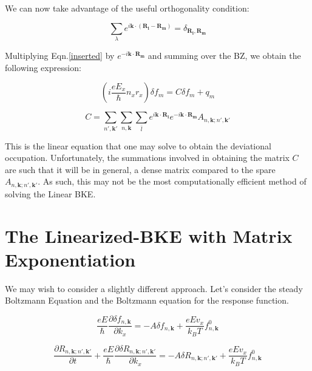\documentclass[preprint,12pt]{elsarticle}
\begin{document}
\noindent We can now take advantage of the useful orthogonality condition:

\begin{equation}
    \sum_{\lambda} e^{i \mathbf{k}\cdot (\mathbf{R_l}-\mathbf{R_m})} = \delta_{\mathbf{R_l},\mathbf{R_m}}
\end{equation}

\noindent Multiplying Eqn.\ref{inserted} by $e^{-i \mathbf{k}\cdot \mathbf{R_m}}$ and summing over the BZ, we obtain the following expression:

\begin{equation}
    (i \frac{e E_x}{\hbar} n_x r_x) \delta f_m = C \delta f_m + q_m 
\end{equation}

\begin{equation}
    C = \sum_{n',\mathbf{k'}} \sum_{n,\mathbf{k}} \sum_{\bar{l}} e^{i \mathbf{k}\cdot \mathbf{R_l}} e^{-i \mathbf{k}\cdot \mathbf{R_m}} A_{n,\mathbf{k};n',\mathbf{k'}}
\end{equation}

\noindent This is the linear equation that one may solve to obtain the deviational occupation. Unfortunately, the summations involved in obtaining the matrix $C$ are such that it will be in general, a dense matrix compared to the spare $A_{n,\mathbf{k};n',\mathbf{k'}}$. As such, this may not be the most computationally efficient method of solving the Linear BKE.

\section{The Linearized-BKE with Matrix Exponentiation}
\label{S:2}

\noindent We may wish to consider a slightly different approach. Let's consider the steady Boltzmann Equation and the Boltzmann equation for the response function.

\begin{equation}\label{steady}
    \frac{eE}{\hbar} \frac{\partial \delta f_{n,\mathbf{k}}}{\partial k_x} = - A \delta f_{n,\mathbf{k}} + \frac{eEv_x}{k_B T} f_{n,\mathbf{k}}^0
\end{equation}

\begin{equation}\label{response}
    \frac{\partial R_{n,\mathbf{k};n',\mathbf{k'}}}{\partial t}+\frac{eE}{\hbar} \frac{\partial \delta R_{n,\mathbf{k};n',\mathbf{k'}}}{\partial k_x} = - A \delta R_{n,\mathbf{k};n',\mathbf{k'}} + \frac{eEv_x}{k_B T} f_{n,\mathbf{k}}^0
\end{equation}
\end{document}
